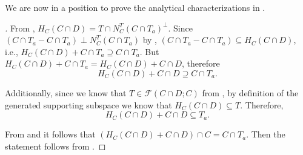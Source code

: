 \documentclass{article}
\theoremstyle{plain}
\theoremstyle{definition}
\theoremstyle{remark}
\begin{document}
We are now in a position to prove the analytical characterizations
in .
\begin{proof}[\hypertarget{loc:the_joint_supporting_subspace_reveals_faces.proof}Proof of \Cref{loc:the_joint_supporting_subspace_reveals_faces.statement}]

From
,
$H_C(C \cap D) = T \cap N_C^T(C \cap T_a)^\perp$. Since $(C \cap T_a - C \cap T_a) \perp N_C^T(C \cap T_a)$ by , $(C \cap T_a - C \cap T_a) \subseteq H_C(C \cap D)$, i.e.,
$H_C(C \cap D) + C \cap T_a \supseteq C \cap T_a$. But $H_C(C \cap D) + C \cap T_a = H_C(C \cap D) + C \cap D$, therefore
\begin{equation}
\label{eq:cont}
H_C(C \cap D) + C \cap D \supseteq C \cap T_a.
\end{equation}

Additionally, since we know that $T \in \mathcal{F}(C \cap D;C)$ from , by definition of the generated supporting subspace we know that
$H_C(C \cap D) \subseteq T$. Therefore, 
\begin{equation}
\label{eq:inc}
H_C(C \cap D) + C \cap D \subseteq T_a.
\end{equation}

From  and  it follows that $(H_C(C \cap D) + C\cap D) \cap C = C \cap T_a$.
Then the statement follows from 
.
\end{proof}
\end{document}

